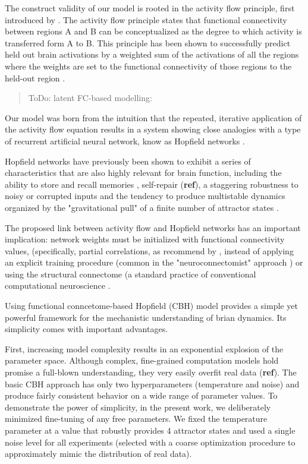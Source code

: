 \documentclass{article}
\begin{document}
The construct validity of our model is rooted in the activity flow principle, first introduced by
\citep{cole2016activity}. The activity flow principle states that functional connectivity between regions A and B can
be conceptualized as the degree to which activity is transferred form A to B. This principle has been shown to
successfully predict held out brain activations by a weighted sum of the activations of all the regions where the
weights are set to the functional connectivity of those regions to the held-out region
\citep{cole2016activity, ito2017cognitive, mill2022network, hearne2021activity, chen2018human}.

\begin{quote}
ToDo: latent FC-based modelling: \cite{McCormick_2022}
\end{quote}

Our model was born from the intuition that the repeated, iterative application of the activity flow equation results in
a system showing close analogies with a type of recurrent artificial neural network, know as Hopfield networks
\citep{hopfield1982neural}.

Hopfield networks have previously been shown to exhibit a series of characteristics that are also highly relevant for
brain function, including the ability to store and recall memories \citep{hopfield1982neural}, self-repair (\textbf{ref}),
a staggering robustness to noisy or corrupted inputs \citep{hertz1991introduction} and the tendency to produce
multistable dynamics organized by the "gravitational pull" of a finite number of attractor states
\citep{khona2022attractor}.

The proposed link between activity flow and Hopfield networks has an important implication: network weights must be
initialized with functional connectivity values, (specifically, partial correlations, as recommend by
\citep{cole2016activity}, instead of applying an explicit training procedure (common in the "neuroconnectomist"
approach \citep{doerig2023neuroconnectionist}) or using the structural connectome (a standard practice of conventional
computational neuroscience \citep{cabral2017functional}.

Using functional conncetome-based Hopfield (CBH) model provides a simple yet powerful framework for the mechanistic
understanding of brian dynamics. Its simplicity comes with important advantages.

First, increasing model complexity results in an exponential explosion of the parameter space. Although complex,
fine-grained computation models hold promise a full-blown understanding, they very easily overfit real data (\textbf{ref}).
The basic CBH approach has only two hyperparameters (temperature and noise) and produce fairly consistent behavior on a
wide range of parameter values. To demonstrate the power of simplicity, in the present work, we deliberately minimized
fine-tuning of any free parameters. We fixed the temperature parameter at a value that robustly provides 4 attractor
states and used a single noise level for all experiments (selected with a coarse optimization procedure to approximately
mimic the distribution of real data).
\end{document}
